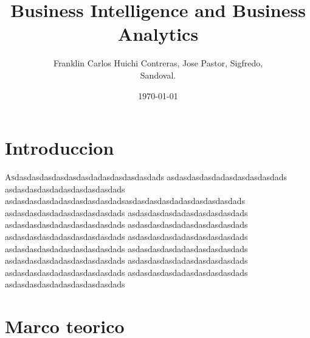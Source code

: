 \documentclass[twoside,twocolumn]{article}
\title{Business Intelligence and Business Analytics}
\author{Franklin Carlos Huichi Contreras, Jose Pastor, Sigfredo, \\
 Sandoval. }
\date{\today}
\begin{document}
\maketitle


\section{Introduccion}
\lettrine[nindent=0em,lines=3]{A}sdasdasdasdasdasdasdadasdasdasdasdads asdasdasdasdadasdasdasdasdads asdasdasdasdadasdasdasdasdads asdasdasdasdadasdasdasdasdadsasdasdasdasdadasdasdasdasdads asdasdasdasdadasdasdasdasdads asdasdasdasdadasdasdasdasdads asdasdasdasdadasdasdasdasdads asdasdasdasdadasdasdasdasdads asdasdasdasdadasdasdasdasdads asdasdasdasdadasdasdasdasdads asdasdasdasdadasdasdasdasdads asdasdasdasdadasdasdasdasdads asdasdasdasdadasdasdasdasdads asdasdasdasdadasdasdasdasdads asdasdasdasdadasdasdasdasdads asdasdasdasdadasdasdasdasdads asdasdasdasdadasdasdasdasdads




\section{Marco teorico}
\end{document}
